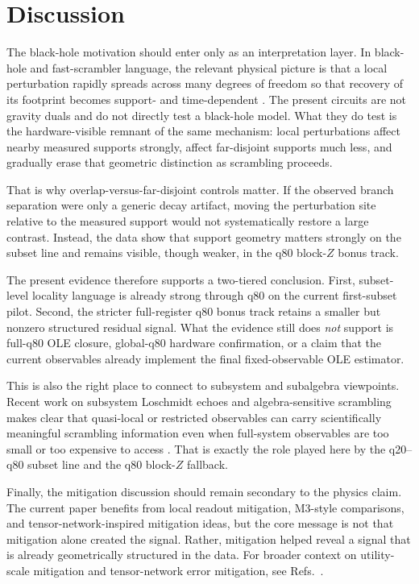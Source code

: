 \documentclass[11pt]{article}
\begin{document}
\section{Discussion}

The black-hole motivation should enter only as an interpretation layer.
In black-hole and fast-scrambler language, the relevant physical picture is that a local perturbation rapidly spreads across many degrees of freedom so that recovery of its footprint becomes support- and time-dependent
\cite{hayden2007blackholes,sekino2008fast,maldacena2016bound}.
The present circuits are not gravity duals and do not directly test a black-hole model.
What they do test is the hardware-visible remnant of the same mechanism:
local perturbations affect nearby measured supports strongly, affect far-disjoint supports much less, and gradually erase that geometric distinction as scrambling proceeds.

That is why overlap-versus-far-disjoint controls matter.
If the observed branch separation were only a generic decay artifact, moving the perturbation site relative to the measured support would not systematically restore a large contrast.
Instead, the data show that support geometry matters strongly on the subset line and remains visible, though weaker, in the q80 block-$Z$ bonus track.

The present evidence therefore supports a two-tiered conclusion.
First, subset-level locality language is already strong through q80 on the current first-subset pilot.
Second, the stricter full-register q80 bonus track retains a smaller but nonzero structured residual signal.
What the evidence still does \emph{not} support is full-q80 OLE closure, global-q80 hardware confirmation, or a claim that the current observables already implement the final fixed-observable OLE estimator.

This is also the right place to connect to subsystem and subalgebra viewpoints.
Recent work on subsystem Loschmidt echoes and algebra-sensitive scrambling makes clear that quasi-local or restricted observables can carry scientifically meaningful scrambling information even when full-system observables are too small or too expensive to access
\cite{karch2025subsystem,andreadakis2024longtime}.
That is exactly the role played here by the q20--q80 subset line and the q80 block-$Z$ fallback.

Finally, the mitigation discussion should remain secondary to the physics claim.
The current paper benefits from local readout mitigation, M3-style comparisons, and tensor-network-inspired mitigation ideas, but the core message is not that mitigation alone created the signal.
Rather, mitigation helped reveal a signal that is already geometrically structured in the data.
For broader context on utility-scale mitigation and tensor-network error mitigation, see Refs.~\cite{filippov2023tem,filippov2024scalability}.
\end{document}
